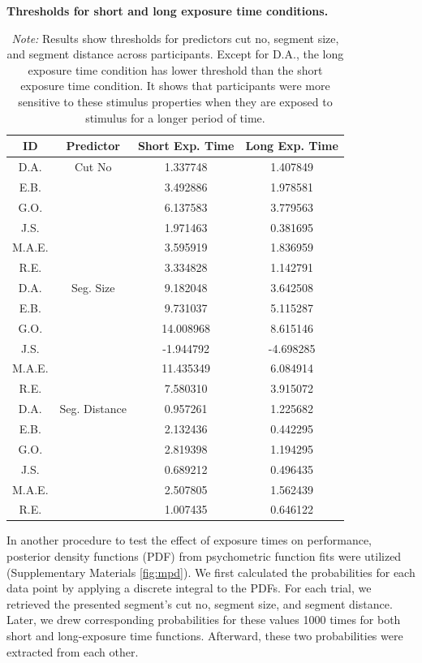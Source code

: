 \documentclass{article}
\begin{document}
\begin{table}[!hb]
    \centering    
    \caption{\textbf{Thresholds for short and long exposure time conditions.}}
    \label{tab:psych_thr}    
    \begin{tabular}{c|ccc}
    \hline
    ID &     Predictor & Short Exp. Time & Long Exp. Time  \\
    \hline    
    D.A. &    Cut No &   1.337748 &  1.407849 \\
    E.B. &     &   3.492886 &  1.978581 \\
    G.O. &     &   6.137583 &  3.779563 \\
    J.S. &     &   1.971463 &  0.381695 \\
    M.A.E. &    &   3.595919 &  1.836959 \\
    R.E. &     &   3.334828 &  1.142791 \\
    \midrule
    D.A. &  Seg. Size &   9.182048 &  3.642508 \\
    E.B. &  &   9.731037 &  5.115287 \\
    G.O. &   &  14.008968 &  8.615146 \\
    J.S. &   &  -1.944792 & -4.698285 \\
    M.A.E. &  &  11.435349 &  6.084914 \\
    R.E. &   &   7.580310 &  3.915072 \\
    \midrule
    D.A. &  Seg. Distance &   0.957261 &  1.225682 \\
    E.B. &   &   2.132436 &  0.442295 \\
    G.O. &   &   2.819398 &  1.194295 \\
    J.S. &   &   0.689212 &  0.496435 \\
    M.A.E. &  &   2.507805 &  1.562439 \\
    R.E. &   &   1.007435 &  0.646122 \\
    \hline
    \end{tabular}
    \captionsetup{labelformat=empty}
    \caption*{\textit{Note:} Results show thresholds for predictors cut no, segment size, and segment distance across participants. Except for D.A., the long exposure time condition has lower threshold than the short exposure time condition. It shows that participants were more sensitive to these stimulus properties when they are exposed to stimulus for a longer period of time.}
\end{table}


In another procedure to test the effect of exposure times on performance, posterior density functions (PDF) from psychometric function fits were utilized (Supplementary Materials \ref{fig:mpd}). We first calculated the probabilities for each data point by applying a discrete integral to the PDFs. For each trial, we retrieved the presented segment's cut no, segment size, and segment distance. Later, we drew corresponding probabilities for these values 1000 times for both short and long-exposure time functions. Afterward, these two probabilities were extracted from each other. 
\end{document}
